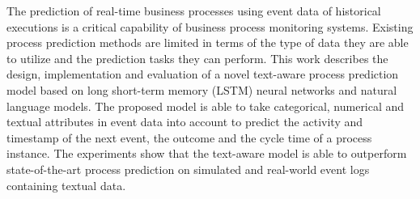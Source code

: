 The prediction of real-time business processes using event data of historical executions is a critical capability of business process monitoring systems.
Existing process prediction methods are limited in terms of the type of data they are able to utilize and the prediction tasks they can perform.
This work describes the design, implementation and evaluation of a novel text-aware process prediction model based on long short-term memory (LSTM) neural networks and natural language models.
The proposed model is able to take categorical, numerical and textual attributes in event data into account to predict the activity and timestamp of the next event, the outcome and the cycle time of a process instance.
The experiments show that the text-aware model is able to outperform state-of-the-art process prediction on simulated and real-world event logs containing textual data.